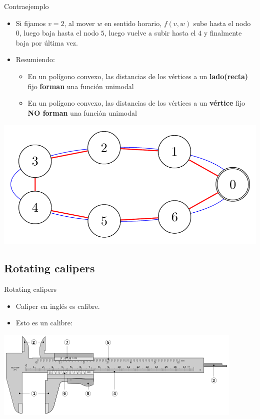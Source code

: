\documentclass[compress]{beamer}
\begin{document}
\begin{frame}{Contraejemplo}
    \begin{itemize}
        \item Si fijamos $v = 2$, al mover $w$ en sentido horario, $f(v,w)$ sube hasta el nodo $0$, luego baja hasta el nodo $5$, luego
           vuelve a subir hasta el $4$ y finalmente baja por última vez.
        \item Resumiendo:
            \begin{itemize}
                \item En un polígono convexo, las distancias de los vértices a un \textbf{lado(recta)} fijo \textbf{forman} una función unimodal
                \item En un polígono convexo, las distancias de los vértices a un \textbf{vértice} fijo \textbf{NO forman} una función unimodal
            \end{itemize}
    \end{itemize}
    {\hfill \includegraphics[scale = 0.3]{images/poligono-elipse.png} \hfill}
\end{frame}


\subsection{Rotating calipers}

\begin{frame}{Rotating calipers}
    \begin{itemize}
        \item Caliper en inglés es calibre.
        \item Esto es un calibre:
    \end{itemize}
        \includegraphics[scale = 0.75]{images/calibre.png}
\end{frame}
\end{document}
